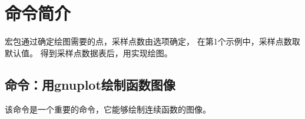 \documentclass[../main.tex]{subfiles}
\begin{document}
\section{命令简介}

宏包通过确定绘图需要的点，采样点数由选项确定，
在第1个示例中，采样点数取默认值。
得到采样点数据表后，用\TIKZ{}实现绘图。

\subsection{命令：用gnuplot绘制函数图像}
该命令是一个重要的命令，它能够绘制连续函数的图像。\hypertarget{tfct}{}
\end{document}
